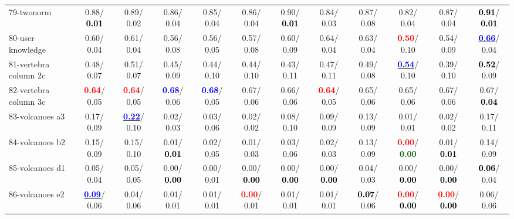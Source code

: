 \begin{table}[h]
\begin{center}
{\begin{tabular}{lc|c|c|c|c|c|c|c|c|c|c}
79-twonorm &   0.88/\textcolor{black}{\textbf{  0.01}} &   0.89/  0.02 &   0.86/  0.04 &   0.85/  0.04 &   0.86/  0.04 &   0.90/\textcolor{black}{\textbf{  0.01}} &   0.84/  0.03 &   0.87/  0.08 &   0.82/  0.04 &   0.87/  0.04 & \textcolor{black}{\textbf{  0.91}}/\textcolor{black}{\textbf{  0.01}} \\
80-user knowledge &   0.60/  0.04 &   0.61/  0.04 &   0.56/  0.08 &   0.56/  0.05 &   0.57/  0.08 &   0.60/  0.09 &   0.64/  0.04 &   0.63/  0.04 & \textcolor{red}{\textbf{  0.50}}/  0.10 &   0.54/  0.09 & \underline{\textcolor{blue}{\textbf{  0.66}}}/  0.04 \\
81-vertebra column 2c &   0.48/  0.07 &   0.51/  0.07 &   0.45/  0.09 &   0.44/  0.10 &   0.44/  0.10 &   0.43/  0.11 &   0.47/  0.11 &   0.49/  0.08 & \underline{\textcolor{blue}{\textbf{  0.54}}}/  0.10 &   0.39/  0.10 & \textcolor{black}{\textbf{  0.52}}/  0.09 \\
82-vertebra column 3c & \textcolor{red}{\textbf{  0.64}}/  0.05 & \textcolor{red}{\textbf{  0.64}}/  0.05 & \textcolor{blue}{\textbf{  0.68}}/  0.06 & \textcolor{blue}{\textbf{  0.68}}/  0.05 &   0.67/  0.06 &   0.66/  0.06 & \textcolor{red}{\textbf{  0.64}}/  0.05 &   0.65/  0.06 &   0.65/  0.06 &   0.67/  0.06 &   0.67/\textcolor{black}{\textbf{  0.04}} \\
83-volcanoes a3 &   0.17/  0.09 & \underline{\textcolor{blue}{\textbf{  0.22}}}/  0.10 &   0.02/  0.03 &   0.03/  0.06 &   0.02/  0.02 &   0.08/  0.10 &   0.09/  0.09 &   0.13/  0.09 &   0.01/  0.01 &   0.02/  0.02 &   0.17/  0.11 \\
84-volcanoes b2 &   0.15/  0.09 &   0.15/  0.10 &   0.01/\textcolor{black}{\textbf{  0.01}} &   0.02/  0.05 &   0.01/  0.03 &   0.03/  0.06 &   0.02/  0.03 &   0.13/  0.09 & \textcolor{red}{\textbf{  0.00}}/\textcolor{darkgreen}{\textbf{  0.00}} &   0.01/\textcolor{black}{\textbf{  0.01}} &   0.14/  0.09 \\
85-volcanoes d1 &   0.05/  0.04 &   0.05/  0.05 &   0.00/\textcolor{black}{\textbf{  0.00}} &   0.00/  0.01 &   0.00/\textcolor{black}{\textbf{  0.00}} &   0.00/\textcolor{black}{\textbf{  0.00}} &   0.00/\textcolor{black}{\textbf{  0.00}} &   0.04/  0.03 &   0.00/\textcolor{black}{\textbf{  0.00}} &   0.00/\textcolor{black}{\textbf{  0.00}} & \textcolor{black}{\textbf{  0.06}}/  0.04 \\ \hline
86-volcanoes e2 & \underline{\textcolor{blue}{\textbf{  0.09}}}/  0.06 &   0.04/  0.06 &   0.01/  0.01 &   0.01/  0.01 & \textcolor{red}{\textbf{  0.00}}/  0.01 &   0.01/  0.01 &   0.01/  0.01 & \textcolor{black}{\textbf{  0.07}}/  0.06 & \textcolor{red}{\textbf{  0.00}}/\textcolor{black}{\textbf{  0.00}} & \textcolor{red}{\textbf{  0.00}}/\textcolor{black}{\textbf{  0.00}} &   0.06/  0.06 \\

\end{tabular}}
\end{center}
\end{table}

